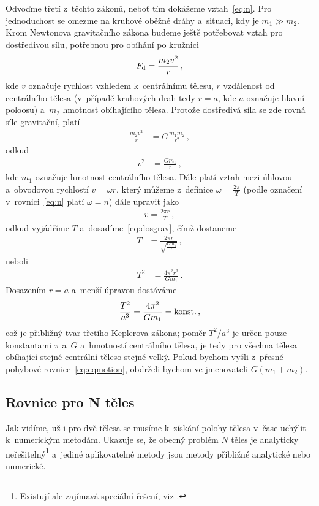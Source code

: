 \documentclass[A4paper, 12pt, oneside]{book}
\begin{document}
Odvoďme třetí z~těchto zákonů, neboť tím dokážeme vztah~\eqref{eq:n}. Pro jednoduchost se omezme na kruhové oběžné dráhy a~situaci, kdy je $m_1 \gg m_2$. Krom Newtonova gravitačního zákona budeme ještě potřebovat vztah pro dostředivou sílu, potřebnou pro obíhání po kružnici
\begin{align}
	F_{\rm d}=\frac{m_2v^2}{r}\,,
\end{align}
kde $v$ označuje rychlost vzhledem k~centrálnímu tělesu, $r$ vzdálenost od centrálního tělesa (v~případě kruhových drah tedy $r=a$, kde $a$ označuje hlavní poloosu) a~$m_2$ hmotnost obíhajícího tělesa. Protože dostředivá síla se zde rovná síle gravitační, platí
\begin{align}
	\frac{m_2v^2}{r}&=G\frac{m_1m_2}{r^2}\,,
\end{align}
	odkud
\begin{align}
	v^2&=\frac{Gm_1}{r}\,, \label{eq:dosgrav}
\end{align}
kde $m_1$ označuje hmotnost centrálního tělesa. Dále platí vztah mezi úhlovou a~obvodovou rychlostí $v=\omega r$, který můžeme z~definice $\omega=\frac{2\pi}{T}$ (podle označení v~rovnici~\eqref{eq:n} platí $\omega=n$) dále upravit jako
\begin{align}
	v=\frac{2\pi r}{T}\,,
\end{align}
odkud vyjádříme $T$ a~dosadíme~\eqref{eq:dosgrav}, čímž dostaneme
\begin{align}
	T&=\frac{2\pi r}{\sqrt{\frac{Gm_1}{r}}}\,,
\end{align}
	neboli
\begin{align}
	T^2&=\frac{4\pi^2 r^3}{Gm_1}\,.
\end{align}
Dosazením $r=a$ a~menší úpravou dostáváme
\begin{align}
	\frac{T^2}{a^3}=\frac{4\pi^2}{Gm_1}={\rm konst.}\,,
\end{align}
což je přibližný tvar třetího Keplerova zákona; poměr $T^2/a^3$ je určen pouze konstantami $\pi$ a~$G$ a~hmotností centrálního tělesa, je tedy pro všechna tělesa obíhající stejné centrální těleso stejně velký. Pokud bychom vyšli z~přesné pohybové rovnice~\eqref{eq:eqmotion}, obdrželi bychom ve jmenovateli $G(m_1+m_2)$. 

\subsection{Rovnice pro N těles}
Jak vidíme, už i pro dvě tělesa se musíme k~získání polohy tělesa v~čase uchýlit k~numerickým metodám. Ukazuje se, že obecný problém $N$ těles je analyticky neřešitelný\footnote{Existují ale zajímavá speciální řešení, viz \cite{cohan12}.} a~jediné aplikovatelné metody jsou metody přibližné analytické nebo numerické.
\end{document}
